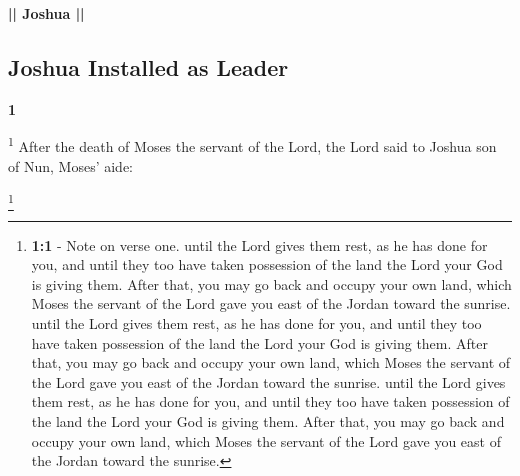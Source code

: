 \documentclass[12pt,twoside]{article}
\newcommand{\vs}[1]{\textsuperscript{#1}}
\newcommand{\vnote}[2]{%
  \begingroup
  \renewcommand\thefootnote{}%
  \footnote{\textbf{}#2}%
  \addtocounter{footnote}{-1}%
  \endgroup
}
\begin{document}
\begin{center}
{\fontsize{40pt}{48pt}\selectfont \textbf{|| Joshua ||}}\\
\vspace{0.5cm}
\end{center}
\thispagestyle{fancy}




\subsection*{\textbf{Joshua Installed as Leader}}

\noindent
\begin{minipage}[t]{1.5cm}
  \vspace{-0.4\baselineskip} %
  {\fontsize{40pt}{48pt}\selectfont \textbf{1}}
\end{minipage}%
\hspace{-0.3cm}%
\begin{minipage}[t]{\dimexpr\linewidth - 1.5cm - 0.5cm\relax}
    \vs{1} After the death of Moses the servant of the Lord, the Lord said to Joshua son of Nun, Moses' aide:
\end{minipage}
\vnote{1}{\textbf{1:1} - Note on verse one. until the Lord gives them rest, as he has done for you, and until they too have taken possession of the land the Lord your God is giving them. After that, you may go back and occupy your own land, which Moses the servant of the Lord gave you east of the Jordan toward the sunrise. until the Lord gives them rest, as he has done for you, and until they too have taken possession of the land the Lord your God is giving them. After that, you may go back and occupy your own land, which Moses the servant of the Lord gave you east of the Jordan toward the sunrise. until the Lord gives them rest, as he has done for you, and until they too have taken possession of the land the Lord your God is giving them. After that, you may go back and occupy your own land, which Moses the servant of the Lord gave you east of the Jordan toward the sunrise.}
\end{document}
